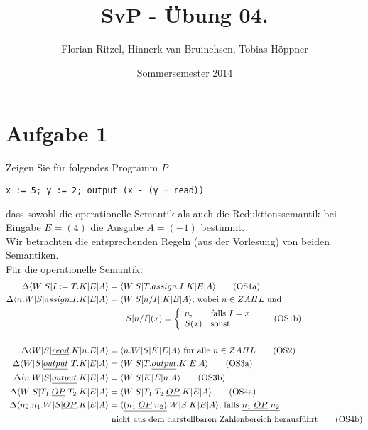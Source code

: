 \documentclass[ngerman,a4paper]{report}
\author{Florian Ritzel, Hinnerk van Bruinehsen, Tobias Höppner}
\title{SvP - Übung 04. }
\date{Sommersemester 2014}
\renewcommand{\maketitle}{}
\begin{document}
\maketitle
\section*{Aufgabe 1}
Zeigen Sie für folgendes Programm $P$
\begin{lstlisting}
x := 5; y := 2; output (x - (y + read))
\end{lstlisting}
dass sowohl die operationelle Semantik als auch die Reduktionssemantik bei Eingabe $E = (4)$ die Ausgabe $A = (-1)$ bestimmt.\\
Wir betrachten die entsprechenden Regeln (aus der Vorlesung) von beiden Semantiken.\\
Für die operationelle Semantik:
\begin{align}
\Delta\langle W|S|I:=T.K|E|A\rangle &= \langle W|S|T.assign.I.K|E|A\rangle \tag{OS1a}\\
\Delta\langle n.W|S|assign.I.K|E|A\rangle &= \langle W|S[n/I]|K|E|A\rangle\text{, wobei }n\in ZAHL\text{ und } \notag\\&\quad\quad S[n/I](x) = \left\lbrace\begin{array}{l l}
n,&\text{falls }I =x\notag\\
	S(x)& \text{sonst}\notag\\
\end{array}\right.\tag{OS1b}\\\notag \\
\Delta\langle W|S|\underline{read}.K|n.E|A\rangle &= \langle n.W|S|K|E|A\rangle\text{ für alle }n\in ZAHL\tag{OS2}\\
\Delta\langle W|S|\underline{output}\ T.K|E|A\rangle &= \langle W|S|T.\underline{output}.K|E|A\rangle\tag{OS3a}\\
\Delta\langle n.W|S|\underline{output}.K|E|A\rangle &= \langle W|S|K|E|n.A\rangle\tag{OS3b}\\
\Delta\langle W|S|T_1\;\underline{OP}\;T_2.K|E|A\rangle &= \langle W|S|T_1.T_2.\underline{OP}.K|E|A\rangle\tag{OS4a}\\
\Delta\langle n_2.n_1.W|S|\underline{OP}.K|E|A\rangle &= \langle \underline{(n_1\;\underline{OP}\;n_2)}.W|S|K|E|A\rangle\text{, falls }\underline{n_1\ \underline{OP}\ n_2}\notag\\&\text{ nicht aus dem darstellbaren Zahlenbereich herausführt}\tag{OS4b}\\\notag
\end{align}
\end{document}
